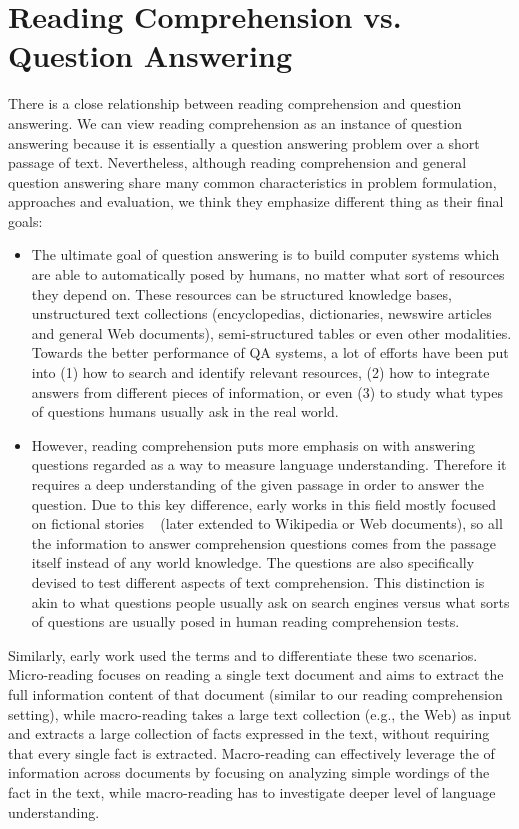 
\section{Reading Comprehension vs. Question Answering}
\label{sec:rc-qa-diff}

There is a close relationship between reading comprehension and question answering.  We can view reading comprehension as an instance of question answering because it is essentially a question answering problem over a short passage of text. Nevertheless, although reading comprehension and general question answering share many common characteristics in problem formulation, approaches and evaluation, we think they emphasize different thing as their final goals:

\begin{itemize}
    \item
        The ultimate goal of question answering is to build computer systems which are able to automatically  posed by humans, no matter what sort of resources they depend on. These resources can be structured knowledge bases, unstructured text collections (encyclopedias, dictionaries, newswire articles and general Web documents), semi-structured tables or even other modalities. Towards the better performance of QA systems, a lot of efforts have been put into (1) how to search and identify relevant resources, (2) how to integrate answers from different pieces of information, or even (3) to study what types of questions humans usually ask in the real world.
    \item
        However, reading comprehension puts more emphasis on  with answering questions regarded as a way to measure language understanding. Therefore it requires a deep understanding of the given passage in order to answer the question. Due to this key difference, early works in this field mostly focused on fictional stories ~\cite{lehnert1977process} (later extended to Wikipedia or Web documents), so all the information to answer comprehension questions comes from the passage itself instead of any world knowledge. The questions are also specifically devised to test different aspects of text comprehension. This distinction is akin to what questions people usually ask on search engines versus what sorts of questions are usually posed in human reading comprehension tests.
\end{itemize}

Similarly, early work \cite{mitchell2009populating} used the terms  and  to differentiate these two scenarios. Micro-reading focuses on reading a single text document and aims to extract the full information content of that document (similar to our reading comprehension setting), while macro-reading takes a large text collection (e.g., the Web) as input and extracts a large collection of facts expressed in the text, without requiring that every single fact is extracted. Macro-reading can effectively leverage the  of information across documents by focusing on analyzing simple wordings of the fact in the text, while macro-reading has to investigate deeper level of language understanding.

